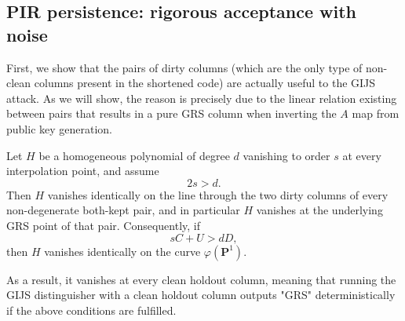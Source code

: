 \subsection{PIR persistence: rigorous acceptance with
    noise}\label{sec:pir-noise}

First, we show that the pairs of dirty columns (which are the only type of
non-clean columns present in the shortened code)
are actually useful to the GIJS attack. As we will show, the reason is
precisely due to the linear relation existing between pairs that results in
a pure GRS column when inverting the $A$ map from public key generation.

\begin{theorem}
    Let $H$ be a homogeneous polynomial of degree $d$ vanishing to
    order $s$ at every interpolation point, and assume
    \begin{equation}
        2s > d.
        \label{eq:line}
    \end{equation}
    Then $H$ vanishes identically on the line through the two dirty
    columns of every non-degenerate both-kept pair, and in particular
    $H$ vanishes at the underlying GRS point of that pair.
    Consequently, if
    \begin{equation}
        sC + U > dD,
        \label{eq:condition}
    \end{equation}
    then $H$ vanishes identically on the curve $\varphi(\mathbf{P}^1)$.

    As a result, it vanishes at every clean holdout column, meaning that
    running
    the
    GIJS distinguisher with a clean holdout column outputs "GRS"
    deterministically
    if the above conditions are fulfilled.
\end{theorem}


